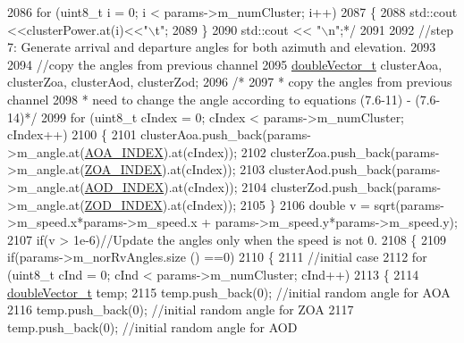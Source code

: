 \begin{DoxyCode}
2086 \textcolor{comment}{        for (uint8\_t i = 0; i < params->m\_numCluster; i++)}
2087 \textcolor{comment}{        \{}
2088 \textcolor{comment}{                std::cout <<clusterPower.at(i)<<"\(\backslash\)t";}
2089 \textcolor{comment}{        \}}
2090 \textcolor{comment}{        std::cout << "\(\backslash\)n";*/}
2091 
2092         \textcolor{comment}{//step 7: Generate arrival and departure angles for both azimuth and elevation.}
2093 
2094         \textcolor{comment}{//copy the angles from previous channel}
2095         \hyperlink{namespacens3_aa6f1edf6566ca6afec613bc6e40240ea}{doubleVector\_t} clusterAoa, clusterZoa, clusterAod, clusterZod;
2096         \textcolor{comment}{/*}
2097 \textcolor{comment}{         * copy the angles from previous channel}
2098 \textcolor{comment}{         * need to change the angle according to equations (7.6-11) - (7.6-14)*/}
2099         \textcolor{keywordflow}{for} (uint8\_t cIndex = 0; cIndex < params->m\_numCluster; cIndex++)
2100         \{
2101                 clusterAoa.push\_back(params->m\_angle.at(\hyperlink{mmwave-3gpp-channel_8h_a7f1d5772b72f2ce425d85a2b41e8842f}{AOA\_INDEX}).at(cIndex));
2102                 clusterZoa.push\_back(params->m\_angle.at(\hyperlink{mmwave-3gpp-channel_8h_a86ab9a21bb66f50f7f4b0c0a0ee1f474}{ZOA\_INDEX}).at(cIndex));
2103                 clusterAod.push\_back(params->m\_angle.at(\hyperlink{mmwave-3gpp-channel_8h_af0ca9ddb9e3346bd827d865de86dc5cb}{AOD\_INDEX}).at(cIndex));
2104                 clusterZod.push\_back(params->m\_angle.at(\hyperlink{mmwave-3gpp-channel_8h_ae854b569d54c7f279a42fae34ad464f9}{ZOD\_INDEX}).at(cIndex));
2105         \}
2106         \textcolor{keywordtype}{double} v = sqrt(params->m\_speed.x*params->m\_speed.x + params->m\_speed.y*params->m\_speed.y);
2107         \textcolor{keywordflow}{if}(v > 1e-6)\textcolor{comment}{//Update the angles only when the speed is not 0.}
2108         \{
2109                 \textcolor{keywordflow}{if}(params->m\_norRvAngles.size () ==0)
2110                 \{
2111                         \textcolor{comment}{//initial case}
2112                         \textcolor{keywordflow}{for} (uint8\_t cInd = 0; cInd < params->m\_numCluster; cInd++)
2113                         \{
2114                                 \hyperlink{namespacens3_aa6f1edf6566ca6afec613bc6e40240ea}{doubleVector\_t} temp;
2115                                 temp.push\_back(0); \textcolor{comment}{//initial random angle for AOA}
2116                                 temp.push\_back(0); \textcolor{comment}{//initial random angle for ZOA}
2117                                 temp.push\_back(0); \textcolor{comment}{//initial random angle for AOD}

\end{DoxyCode}
